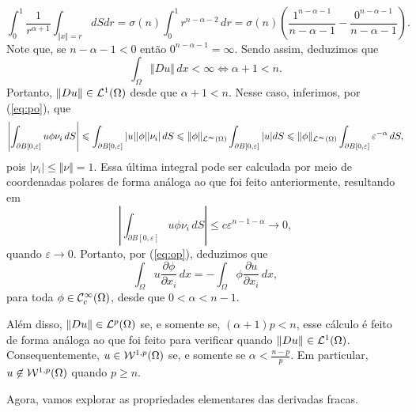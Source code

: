 \begin{ex}
    \[
        \int_0^1 \frac{1}{r^{\alpha+1}}  \int_{\Vert x \Vert = r} dS dr = \sigma(n)\int_0^1 r^{n-\alpha-2} \,dr = \sigma(n)\left(\frac{1^{n-\alpha-1}}{n-\alpha -1} - \frac{0^{n-\alpha-1}}{n-\alpha-1}\right).
    \]
    Note que, se $n - \alpha - 1 < 0$ então $0^{n-\alpha-1} = \infty$. Sendo assim, deduzimos que
    \[
        \int_\Omega \Vert Du \Vert \, dx < \infty \iff \alpha + 1 < n.
    \]
    Portanto, $\Vert Du \Vert \in \mathcal{L}^1(\Omega)$ desde que $\alpha + 1 < n$.
    Nesse caso, inferimos, por (\ref{eq:po}), que
    \[
        \left| \int_{\partial B[0,\varepsilon]} u \phi \nu_i \,dS \right| \leqslant 
        \int_{\partial B[0,\varepsilon]} |u| |\phi| |\nu_i| \,dS \leqslant \Vert \phi \Vert_{\mathcal{L}^\infty(\Omega)}\int_{\partial B[0,\varepsilon]} |u|dS \leqslant \Vert \phi \Vert_{\mathcal{L}^\infty(\Omega)}\int_{\partial B[0,\varepsilon]} \varepsilon^{-\alpha} \,dS,
    \]
    pois $|\nu_i| \leqslant \Vert \nu \Vert = 1$. Essa última integral pode ser calculada por meio de coordenadas polares de forma análoga ao que foi feito anteriormente, resultando em
    \[
        \left| \int_{\partial B[0,\varepsilon]} u \phi \nu_i \,dS \right| \leqslant c \varepsilon^{n-1-\alpha} \to 0,
    \]
    quando $\varepsilon \to 0$. Portanto, por (\ref{eq:op}), deduzimos que
    \[
        \int_{\Omega} u \dfrac{\partial \phi}{\partial x_i} \, dx = -\int_{\Omega} \phi \dfrac{\partial u}{\partial x_i} \,dx,
    \]
    para toda $\phi \in \mathcal{C}^\infty_c(\Omega)$, desde que $0 < \alpha < n-1$. 

    Além disso, $\Vert Du \Vert \in \mathcal{L}^p(\Omega)$ se, e somente se, $(\alpha + 1)p < n$, esse cálculo é feito de forma análoga ao que foi feito para verificar quando $\Vert Du \Vert \in \mathcal{L}^1(\Omega)$. Consequentemente, $u \in \mathcal{W}^{1,p}(\Omega)$ se, e somente se $\alpha < \frac{n-p}{p}$.
    Em particular, $u \not\in \mathcal{W}^{1,p}(\Omega)$ quando $p \geqslant n$.
\end{ex}

Agora, vamos explorar as propriedades elementares das derivadas fracas.

